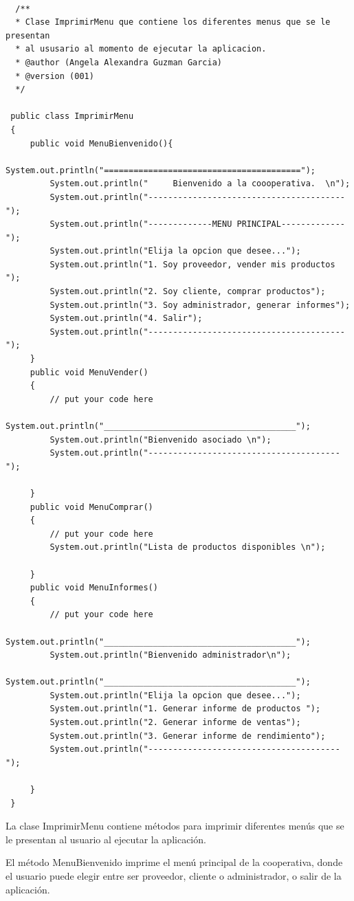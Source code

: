 \documentclass[10pt,a4paper]{article}
\def\StartLineAt#1{\lstset{firstnumber=#1}}
\begin{document}
  
\StartLineAt{1}
\begin{lstlisting}[style=Java]

  /**
  * Clase ImprimirMenu que contiene los diferentes menus que se le presentan
  * al ususario al momento de ejecutar la aplicacion.
  * @author (Angela Alexandra Guzman Garcia) 
  * @version (001)
  */
 
 public class ImprimirMenu
 {
     public void MenuBienvenido(){
         System.out.println("========================================");
         System.out.println("     Bienvenido a la coooperativa.  \n");
         System.out.println("----------------------------------------");
         System.out.println("-------------MENU PRINCIPAL-------------");
         System.out.println("Elija la opcion que desee...");
         System.out.println("1. Soy proveedor, vender mis productos ");
         System.out.println("2. Soy cliente, comprar productos");
         System.out.println("3. Soy administrador, generar informes");
         System.out.println("4. Salir");
         System.out.println("----------------------------------------");
     }
     public void MenuVender()
     {
         // put your code here
         System.out.println("_______________________________________");
         System.out.println("Bienvenido asociado \n");
         System.out.println("---------------------------------------");
         
     }
     public void MenuComprar()
     {
         // put your code here
         System.out.println("Lista de productos disponibles \n");
         
     }
     public void MenuInformes()
     {
         // put your code here
         System.out.println("_______________________________________");
         System.out.println("Bienvenido administrador\n");
         System.out.println("_______________________________________");
         System.out.println("Elija la opcion que desee...");
         System.out.println("1. Generar informe de productos ");
         System.out.println("2. Generar informe de ventas");
         System.out.println("3. Generar informe de rendimiento");
         System.out.println("---------------------------------------");
         
     }   
 }
\end{lstlisting}

La clase ImprimirMenu contiene métodos para imprimir diferentes menús que se le presentan al usuario al ejecutar la aplicación.

El método MenuBienvenido imprime el menú principal de la cooperativa, donde el usuario puede elegir entre ser proveedor, cliente o administrador, o salir de la aplicación.
\end{document}
